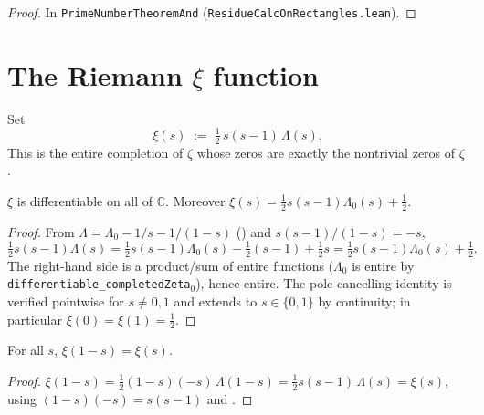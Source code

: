 \begin{proof}
\leanok
In \texttt{PrimeNumberTheoremAnd} (\texttt{ResidueCalcOnRectangles.lean}).
\end{proof}

\section{The Riemann \texorpdfstring{$\xi$}{xi} function}
\label{sec:nf_xi}

\begin{definition}[Riemann $\xi$]
\label{def:nf_xi}
\leanok
Set
\[
  \xi(s) \;:=\; \tfrac12\, s(s-1)\,\Lambda(s).
\]
This is the entire completion of $\zeta$ whose zeros are exactly the nontrivial
zeros of $\zeta$.
\end{definition}

\begin{lemma}[$\xi$ is entire]
\label{lem:nf_xi_entire}
\leanok
{}
$\xi$ is differentiable on all of $\mathbb{C}$. Moreover
$\xi(s) = \tfrac12 s(s-1)\Lambda_0(s) + \tfrac12$.
\end{lemma}

\begin{proof}
\leanok
{}
From $\Lambda = \Lambda_0 - 1/s - 1/(1-s)$ () and
$s(s-1)/(1-s) = -s$,
\[
  \tfrac12 s(s-1)\Lambda(s)
  = \tfrac12 s(s-1)\Lambda_0(s) - \tfrac12(s-1) + \tfrac12 s
  = \tfrac12 s(s-1)\Lambda_0(s) + \tfrac12 .
\]
The right-hand side is a product/sum of entire functions
($\Lambda_0$ is entire by \texttt{differentiable\_completedZeta}$_0$), hence entire.
The pole-cancelling identity is verified pointwise for $s\neq 0,1$ and extends to
$s\in\{0,1\}$ by continuity; in particular $\xi(0)=\xi(1)=\tfrac12$.
\end{proof}

\begin{lemma}
\label{lem:nf_xi_one_sub}
\leanok
{}
For all $s$, $\xi(1-s) = \xi(s)$.
\end{lemma}

\begin{proof}
\leanok
{}
$\xi(1-s) = \tfrac12 (1-s)(-s)\,\Lambda(1-s)
          = \tfrac12 s(s-1)\,\Lambda(s) = \xi(s)$,
using $(1-s)(-s) = s(s-1)$ and .
\end{proof}

